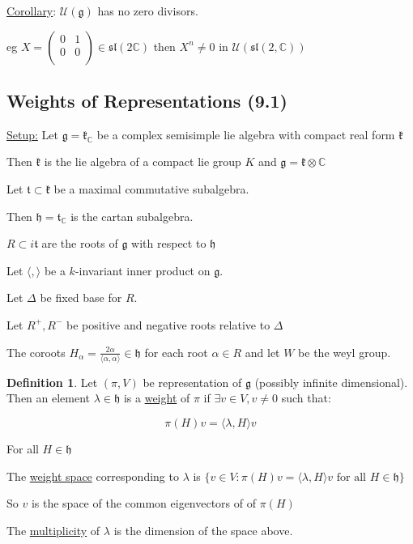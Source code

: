 \documentclass{article}
\theoremstyle{definition}
\newtheorem{definition}{Definition}
\begin{document}
\underline{Corollary}: \(\mathcal{U}(\mathfrak{g})\) has no zero divisors.

eg \(X = \begin{pmatrix}
    0 &  1 \\
    0 &  0 \\
\end{pmatrix}\in \mathfrak{sl} (2\mathbb{C})\) then \(X^n\neq 0\) in \(\mathcal{U} (\mathfrak{sl} (2,\mathbb{C}))\) 

\subsection*{Weights of Representations (9.1)}

\underline{Setup:} Let \(\mathfrak{g} = \mathfrak{k} _\mathbb{C} \) be a complex semisimple lie algebra with compact real form \(\mathfrak{k}\) 

Then \(\mathfrak{k}\) is the lie algebra of a compact lie group \(K\) and \(\mathfrak{g} = \mathfrak{k} \otimes \mathbb{C} \)

Let \(\mathfrak{t} \subset \mathfrak{k}\) be a maximal commutative subalgebra.

Then \(\mathfrak{h} = \mathfrak{t} _\mathbb{C}\) is the cartan subalgebra.

\(R \subset i \mathfrak{t}\) are the roots of \(\mathfrak{g}\) with respect to \(\mathfrak{h}\) 

Let \(\langle , \rangle \) be a \(k\)-invariant inner product on \(\mathfrak{g}\).

Let \(\Delta \) be fixed base for \(R\).

Let \(R^+, R^-\) be positive and negative roots relative to \(\Delta\) 

The coroots \(H_\alpha = \frac{2\alpha}{\langle \alpha ,\alpha  \rangle }\in \mathfrak{h}\) for each root \(\alpha \in R\) and let \(W\) be the weyl group.

\begin{definition}
    Let \((\pi ,V)\) be representation of \(\mathfrak{g}\) (possibly infinite dimensional). Then an element \(\lambda \in \mathfrak{h}\) is a \underline{weight} of \(\pi\) if \(\exists v\in V, v\neq 0\) such that:

    \[
        \pi (H)v = \langle \lambda , H \rangle v
    \]

    For all \(H\in \mathfrak{h}\) 

    The \underline{weight space} corresponding to \(\lambda \) is \(\{ v\in V : \pi (H)v = \langle \lambda ,H \rangle v \text{ for all } H\in \mathfrak{h} \} \)

    So \(v\) is the space of the common eigenvectors of of \(\pi (H)\) 

    The \underline{multiplicity} of \(\lambda\) is the dimension of the space above.

\end{definition}
\end{document}
